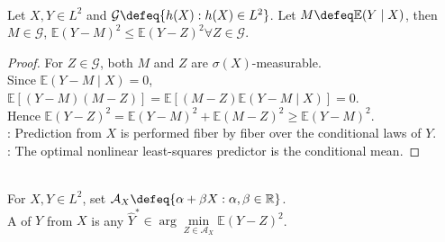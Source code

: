 \begin{theorem} \label{thm:conditional-expectation-best-l2-predictor} \\
Let $X,Y\in L^2$ and $\mathcal{G}\defeq\{h(X):h(X)\in L^2\}$. Let $M\defeq\mathbb{E}(Y\mid X)$, then $M\in\mathcal{G}$, $\mathbb{E}(Y-M)^2\leq\mathbb{E}(Y-Z)^2$$\forall Z\in\mathcal{G}$.
\begin{proof}
For $Z\in\mathcal{G}$, both $M$ and $Z$ are $\sigma(X)$-measurable.\\
Since $\mathbb{E}(Y-M\mid X)=0$, $\mathbb{E}[(Y-M)(M-Z)]=\mathbb{E}[(M-Z)\mathbb{E}(Y-M\mid X)]=0$.\\
Hence $\mathbb{E}(Y-Z)^2=\mathbb{E}(Y-M)^2+\mathbb{E}(M-Z)^2\geq\mathbb{E}(Y-M)^2$.\\
: Prediction from $X$ is performed fiber by fiber over the conditional laws of $Y$.\\
: The optimal nonlinear least-squares predictor is the conditional mean.
\end{proof}
\end{theorem}

\begin{definition} \label{def:best-linear-predictor} \\
For $X,Y\in L^2$, set $\mathcal{A}_X\defeq\{\alpha+\beta X:\alpha,\beta\in\mathbb{R}\}$.\\
A  of $Y$ from $X$ is any $\widehat{Y}^*\in\arg\min\limits_{Z\in\mathcal{A}_X}\mathbb{E}(Y-Z)^2$.
\end{definition}

